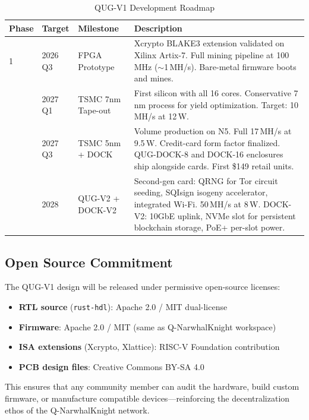 \documentclass[11pt,a4paper]{article}
\begin{document}
\begin{table}[H]
\centering
\caption{QUG-V1 Development Roadmap}
\begin{tabular}{@{}lllp{7cm}@{}}
\toprule
\textbf{Phase} & \textbf{Target} & \textbf{Milestone} & \textbf{Description} \\
\midrule
1 & 2026 Q3 & FPGA Prototype & Xcrypto BLAKE3 extension validated on Xilinx Artix-7. Full mining pipeline at 100\,MHz ($\sim$1\,MH/s). Bare-metal firmware boots and mines. \\
\addlinespace
2 & 2027 Q1 & TSMC 7nm Tape-out & First silicon with all 16 cores. Conservative 7\,nm process for yield optimization. Target: 10\,MH/s at 12\,W. \\
\addlinespace
3 & 2027 Q3 & TSMC 5nm + DOCK & Volume production on N5. Full 17\,MH/s at 9.5\,W. Credit-card form factor finalized. QUG-DOCK-8 and DOCK-16 enclosures ship alongside cards. First \$149 retail units. \\
\addlinespace
4 & 2028 & QUG-V2 + DOCK-V2 & Second-gen card: QRNG for Tor circuit seeding, SQIsign isogeny accelerator, integrated Wi-Fi. 50\,MH/s at 8\,W. DOCK-V2: 10GbE uplink, NVMe slot for persistent blockchain storage, PoE+ per-slot power. \\
\bottomrule
\end{tabular}
\end{table}

\subsection{Open Source Commitment}

The QUG-V1 design will be released under permissive open-source licenses:

\begin{itemize}
    \item \textbf{RTL source} (\texttt{rust-hdl}): Apache 2.0 / MIT dual-license
    \item \textbf{Firmware}: Apache 2.0 / MIT (same as Q-NarwhalKnight workspace)
    \item \textbf{ISA extensions} (Xcrypto, Xlattice): RISC-V Foundation contribution
    \item \textbf{PCB design files}: Creative Commons BY-SA 4.0
\end{itemize}

This ensures that any community member can audit the hardware, build custom firmware, or manufacture compatible devices---reinforcing the decentralization ethos of the Q-NarwhalKnight network.
\end{document}

